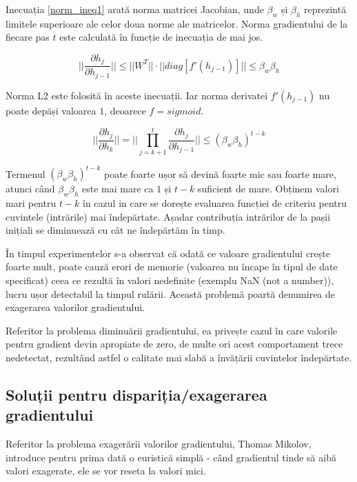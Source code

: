 Inecuația \ref{norm_ineq1} arată norma matricei Jacobian, unde $\beta_w$ și $\beta_h$ reprezintă limitele superioare ale celor doua norme ale matricelor. Norma gradientului de la fiecare pas $t$ este calculată în funcție de inecuația de mai jos.

\begin{equation}
	|| \frac{\partial h_j}{\partial h_{j-1}}|| \leq || W^T || \cdot || diag[f'(h_{j-1})]|| \leq \beta_w\beta_h
	\label{norm_ineq1}
\end{equation}

Norma L2 este folosită în aceste inecuații. Iar norma derivatei $f'(h_{j-1})$ nu poate depăși valoarea $1$, deoarece $f=sigmoid$.

\begin{equation}
	|| \frac{\partial h_j}{\partial h_k}|| = || \prod_{j=k+1}^{t} \frac{\partial h_j}{\partial h_{j-1}} || \leq (\beta_w\beta_h)^{t-k}
\end{equation}
 	
Termenul $(\beta_w\beta_h)^{t-k}$ poate foarte ușor să devină foarte mic sau foarte mare, atunci când $\beta_w\beta_h$ este mai mare ca $1$ și $t-k$ suficient de mare. Obținem valori mari pentru $t-k$ în cazul in care se dorește evaluarea funcției de criteriu pentru cuvintele (intrările) mai îndepărtate. Așadar contribuția intrărilor de la pașii inițiali se diminuează cu cât ne îndepărtăm în timp.

În timpul experimentelor s-a observat că odată ce valoare gradientului crește foarte mult, poate cauză erori de memorie (valoarea nu încape în tipul de date specificat) ceea ce rezultă în valori nedefinite (exemplu NaN (not a number)), lucru ușor detectabil la timpul rulării. Această problemă poartă denumirea de exagerarea valorilor gradientului.

Referitor la problema diminuării gradientului, ea privește cazul în care valorile pentru gradient devin apropiate de zero, de multe ori acest comportament trece nedetectat, rezultând astfel o calitate mai slabă a învățării cuvintelor îndepărtate.

\subsection{Soluții pentru dispariția/exagerarea gradientului}

Referitor la problema exagerării valorilor gradientului, Thomas Mikolov, introduce pentru prima dată o euristică simplă - când gradientul tinde să aibă valori exagerate, ele se vor reseta la valori mici.

